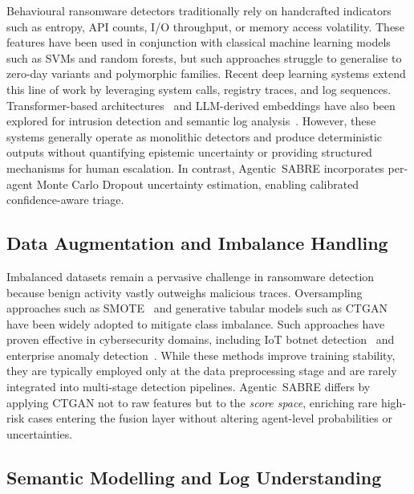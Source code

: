 \documentclass[lettersize,journal]{IEEEtran}
\begin{document}
Behavioural ransomware detectors traditionally rely on handcrafted indicators such as entropy, API counts, I/O throughput, or memory access volatility. These features have been used in conjunction with classical machine learning models such as SVMs and random forests, but such approaches struggle to generalise to zero-day variants and polymorphic families. Recent deep learning systems extend this line of work by leveraging system calls, registry traces, and log sequences. Transformer-based architectures~\cite{vaswani2017attention} and LLM-derived embeddings have also been explored for intrusion detection and semantic log analysis~\cite{tian2025llmsurvey, BenchmarkingLLMsPhishing2024,
CANAL_CTILLM2024}. However, these systems generally operate as monolithic
detectors and produce deterministic outputs without quantifying epistemic
uncertainty or providing structured mechanisms for human escalation. In contrast, Agentic~SABRE incorporates per-agent Monte Carlo Dropout uncertainty estimation, enabling calibrated confidence-aware triage.

\subsection{Data Augmentation and Imbalance Handling}

Imbalanced datasets remain a pervasive challenge in ransomware detection because benign activity vastly outweighs malicious traces. Oversampling approaches such as SMOTE~\cite{chawla2002smote} and generative tabular models such as CTGAN ~\cite{xu2019ctgan, ashrapov2020tabular} have been widely adopted to mitigate class imbalance. Such approaches have proven effective in cybersecurity domains, including IoT botnet detection~\cite{HabibiCL23} and enterprise anomaly detection~\cite{AIenhancedDefense2022}. While these methods improve training
stability, they are typically employed only at the data preprocessing stage and are rarely integrated into multi-stage detection pipelines. Agentic~SABRE differs by applying CTGAN not to raw features but to the \emph{score space}, enriching rare high-risk cases entering the fusion layer without altering agent-level probabilities or uncertainties.

\subsection{Semantic Modelling and Log Understanding}
\end{document}
